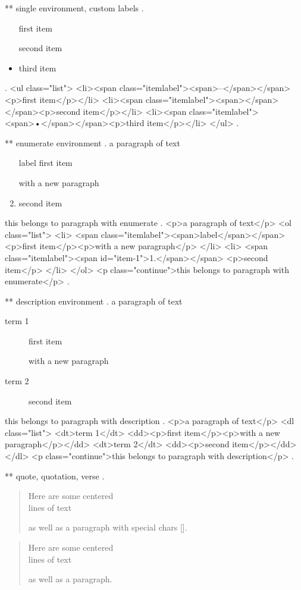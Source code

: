 ** single environment, custom labels
.
\begin{itemize}
    \item[\textendash] first item
    \item[] second item
    \item third item
\end{itemize}
.
<ul class="list">
<li><span class="itemlabel"><span>–</span></span><p>ﬁrst item</p></li>
<li><span class="itemlabel"><span></span></span><p>second item</p></li>
<li><span class="itemlabel"><span>•</span></span><p>third item</p></li>
</ul>
.



** enumerate environment
.
a paragraph of text

\begin{enumerate}
    \item[label] first item

        with a new paragraph
    \item second item
\end{enumerate}
this belongs to paragraph with enumerate
.
<p>a paragraph of text</p>
<ol class="list">
<li>
<span class="itemlabel"><span>label</span></span>
<p>ﬁrst item</p><p>with a new paragraph</p>
</li>
<li>
<span class="itemlabel"><span id="item-1">1.</span></span>
<p>second item</p>
</li>
</ol>
<p class="continue">this belongs to paragraph with enumerate</p>
.


** description environment
.
a paragraph of text

\begin{description}
    \item[term 1] first item

        with a new paragraph
    \item[term 2] second item
\end{description}
this belongs to paragraph with description
.
<p>a paragraph of text</p>
<dl class="list">
<dt>term 1</dt>
<dd><p>ﬁrst item</p><p>with a new paragraph</p></dd>
<dt>term 2</dt>
<dd><p>second item</p></dd>
</dl>
<p class="continue">this belongs to paragraph with description</p>
.

** quote, quotation, verse
.
\begin{quote}
    Here are some centered\\
    lines of text

    as well as a paragraph with special chars [].
\end{quote}

\begin{quotation}
    Here are some centered\\
    lines of text

    as well as a paragraph.
\end{quotation}

